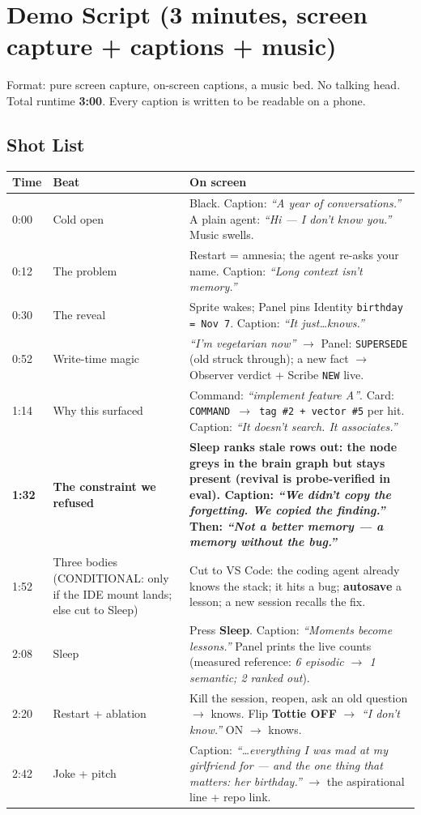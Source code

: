 \chapter{Demo Script (3 minutes, screen capture + captions + music)}

Format: pure screen capture, on-screen captions, a music bed. No talking head. Total runtime
\textbf{3:00}. Every caption is written to be readable on a phone.

\section{Shot List}
\begin{longtable}{@{}p{}p{}p{}@{}}
\toprule
Time & Beat & On screen \\
\midrule
0:00 & Cold open & Black. Caption: \emph{``A year of conversations.''} A plain agent: \emph{``Hi --- I don't know you.''} Music swells. \\
0:12 & The problem & Restart = amnesia; the agent re-asks your name. Caption: \emph{``Long context isn't memory.''} \\
0:30 & The reveal & Sprite wakes; Panel pins Identity \texttt{birthday = Nov 7}. Caption: \emph{``It just\ldots knows.''} \\
0:52 & Write-time magic & \emph{``I'm vegetarian now''} $\rightarrow$ Panel: \texttt{SUPERSEDE} (old struck through); a new fact $\rightarrow$ Observer verdict + Scribe \texttt{NEW} live. \\
1:14 & Why this surfaced & Command: \emph{``implement feature A''}. Card: \texttt{COMMAND $\rightarrow$ tag \#2 + vector \#5} per hit. Caption: \emph{``It doesn't search. It associates.''} \\
\textbf{1:32} & \textbf{The constraint we refused} & \textbf{Sleep ranks stale rows out: the node greys in the brain graph but stays present (revival is probe-verified in eval). Caption: \emph{``We didn't copy the forgetting. We copied the finding.''} Then: \emph{``Not a better memory --- a memory without the bug.''}} \\
1:52 & Three bodies (CONDITIONAL: only if the IDE mount lands; else cut to Sleep) & Cut to VS Code: the coding agent already knows the stack; it hits a bug; \textbf{autosave} a lesson; a new session recalls the fix. \\
2:08 & Sleep & Press \textbf{Sleep}. Caption: \emph{``Moments become lessons.''} Panel prints the live counts (measured reference: \emph{6 episodic $\rightarrow$ 1 semantic; 2 ranked out}). \\
2:20 & Restart + ablation & Kill the session, reopen, ask an old question $\rightarrow$ knows. Flip \textbf{Tottie OFF} $\rightarrow$ \emph{``I don't know.''} ON $\rightarrow$ knows. \\
2:42 & Joke + pitch & Caption: \emph{``\ldots everything I was mad at my girlfriend for --- and the one thing that matters: her birthday.''} $\rightarrow$ the aspirational line + repo link. \\
\bottomrule
\end{longtable}

